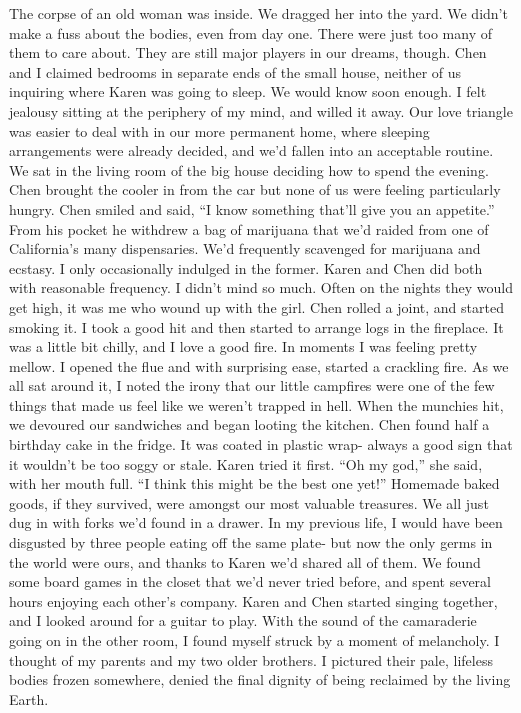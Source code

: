 \documentclass[a4paper]{article}
\begin{document}
The corpse of an old woman was inside. We dragged her into the yard. We didn't make a fuss about the bodies, even from day one. There were just too many of them to care about. They are still major players in our dreams, though.
Chen and I claimed bedrooms in separate ends of the small house, neither of us inquiring where Karen was going to sleep. We would know soon enough. I felt jealousy sitting at the periphery of my mind, and willed it away. Our love triangle was easier to deal with in our more permanent home, where sleeping arrangements were already decided, and we’d fallen into an acceptable routine.
We sat in the living room of the big house deciding how to spend the evening. Chen brought the cooler in from the car but none of us were feeling particularly hungry. Chen smiled and said, “I know something that’ll give you an appetite.”
From his pocket he withdrew a bag of marijuana that we’d raided from one of California’s many dispensaries. We’d frequently scavenged for marijuana and ecstasy. I only occasionally indulged in the former. Karen and Chen did both with reasonable frequency. I didn’t mind so much. Often on the nights they would get high, it was me who wound up with the girl.
Chen rolled a joint, and started smoking it. I took a good hit and then started to arrange logs in the fireplace. It was a little bit chilly, and I love a good fire. In moments I was feeling pretty mellow. I opened the flue and with surprising ease, started a crackling fire. As we all sat around it, I noted the irony that our little campfires were one of the few things that made us feel like we weren’t trapped in hell.
When the munchies hit, we devoured our sandwiches and began looting the kitchen. Chen found half a birthday cake in the fridge. It was coated in plastic wrap- always a good sign that it wouldn't be too soggy or stale. Karen tried it first.
“Oh my god,” she said, with her mouth full. “I think this might be the best one yet!”
Homemade baked goods, if they survived, were amongst our most valuable treasures. We all just dug in with forks we’d found in a drawer. In my previous life, I would have been disgusted by three people eating off the same plate- but now the only germs in the world were ours, and thanks to Karen we’d shared all of them.
We found some board games in the closet that we’d never tried before, and spent several hours enjoying each other’s company. Karen and Chen started singing together, and I looked around for a guitar to play. With the sound of the camaraderie going on in the other room, I found myself struck by a moment of melancholy. I thought of my parents and my two older brothers. I pictured their pale, lifeless bodies frozen somewhere, denied the final dignity of being reclaimed by the living Earth.
\end{document}
